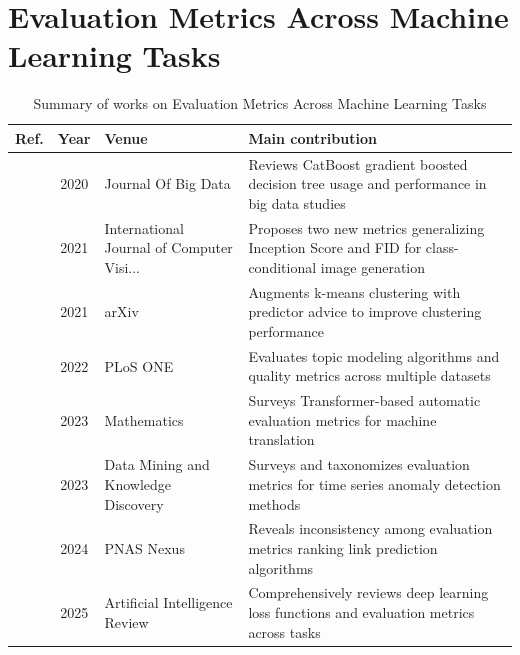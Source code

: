 \section{Evaluation Metrics Across Machine Learning Tasks}\label{sec:theme5}
\begin{table}[!t]
\centering
\renewcommand{\arraystretch}{1.2}
\caption{Summary of works on Evaluation Metrics Across Machine Learning Tasks}\label{tab:theme5}
\begin{tabularx}{\textwidth}{@{}l c p{3.6cm} X@{}}
\toprule
\textbf{Ref.} & \textbf{Year} & \textbf{Venue} & \textbf{Main contribution} \\
\midrule
\cite{hancock2020catboost} & 2020 & Journal Of Big Data & Reviews CatBoost gradient boosted decision tree usage and performance in big data studies \\
\cite{benny2021evaluation} & 2021 & International Journal of Computer Visi... & Proposes two new metrics generalizing Inception Score and FID for class-conditional image generation \\
\cite{ergun2021learning} & 2021 & arXiv & Augments k-means clustering with predictor advice to improve clustering performance \\
\cite{rudiger2022topic} & 2022 & PLoS ONE & Evaluates topic modeling algorithms and quality metrics across multiple datasets \\
\cite{lee2023survey} & 2023 & Mathematics & Surveys Transformer-based automatic evaluation metrics for machine translation \\
\cite{srb2023navigating} & 2023 & Data Mining and Knowledge Discovery & Surveys and taxonomizes evaluation metrics for time series anomaly detection methods \\
\cite{bi2024inconsistency} & 2024 & PNAS Nexus & Reveals inconsistency among evaluation metrics ranking link prediction algorithms \\
\cite{terven2025comprehensive} & 2025 & Artificial Intelligence Review & Comprehensively reviews deep learning loss functions and evaluation metrics across tasks \\
\bottomrule
\end{tabularx}
\end{table}

